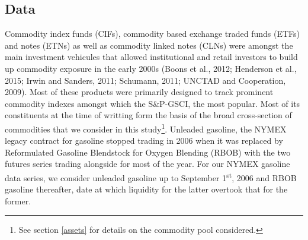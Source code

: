 \documentclass[]{elsarticle} %
\begin{document}
\hypertarget{data}{%
\subsection{Data}\label{data}}

Commodity index funds (CIFs), commodity based exchange traded funds
(ETFs) and notes (ETNs) as well as commodity linked notes (CLNs) were
amongst the main investment vehicules that allowed institutional and
retail investors to build up commodity exposure in the early 2000s
(Boons et al., 2012; Henderson et al., 2015; Irwin and Sanders, 2011;
Schumann, 2011; UNCTAD and Cooperation, 2009). Most of these products
were primarily designed to track prominent commodity indexes amongst
which the S\&P-GSCI, the most popular. Most of its constituents at the
time of writting form the basis of the broad cross-section of
commodities that we consider in this study\footnote{See section
  \ref{assets} for details on the commodity pool considered.}. Unleaded
gasoline, the NYMEX legacy contract for gasoline stopped trading in 2006
when it was replaced by Reformulated Gasoline Blendstock for Oxygen
Blending (RBOB) with the two futures series trading alongside for most
of the year. For our NYMEX gasoline data series, we consider unleaded
gasoline up to September 1\textsuperscript{st}, 2006 and RBOB gasoline
thereafter, date at which liquidity for the latter overtook that for the
former.
\end{document}
